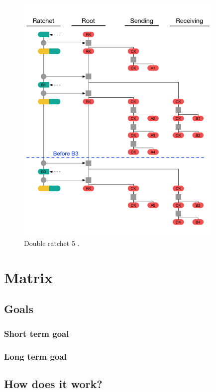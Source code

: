 \begin{figure}[H]
	\centering
	\includegraphics[width=10cm]{figures/doubleratchet5.png}
	\caption{Double ratchet 5 \cite{doubleratchet}.}
	\label{fig:doubleratchet5}
\end{figure}



\newpage
\section{Matrix}

\subsection{Goals}

\subsubsection{Short term goal}

\subsubsection{Long term goal}

\subsection{How does it work?}

